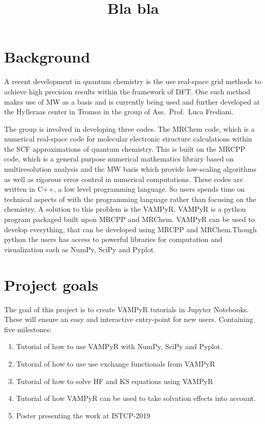 \documentclass[12pt]{article}
\begin{document}
\title{Bla bla}

\maketitle

\section{Background}

A recent development in quantum chemistry is the use real-space grid
methods to achieve high precision results within the framework of
\ac{DFT}. One such method makes use of \ac{MW} as a
basis\cite{harrison2003multiresolution}
and is currently being used and further developed at the Hylleraas
center in Tromsø in the group of Ass.~Prof.~Luca Frediani.

The group is involved in developing three codes. The \ac{MRChem} code, which is
a numerical real-space code for molecular electronic structure calculations
within the \ac{SCF} approximations of quantum chemistry. This is built on
the \ac{MRCPP} code, which is a general purpose numerical mathematics library
based on multiresolution analysis and the \ac{MW} basis which provide
low-scaling algorithms as well as rigorous error control in numerical
computations. These codes are written in C++, a low level programming language.
So users spends time on technical aspects of with the programming
language rather than focusing on the chemistry. A solution to this problem
is the \ac{VAMPyR}. \ac{VAMPyR} is a python program packaged built upon \ac{MRCPP}
and \ac{MRChem}. \ac{VAMPyR} can be used to develop everything, that
can be developed using \ac{MRCPP} and \ac{MRChem}.Though
python the users has access to powerful libraries for computation and
visualization such as NumPy, SciPy and Pyplot.

\section{Project goals}
The goal of this project is to create \ac{VAMPyR} tutorials in Jupyter Notebooks.
These will ensure an easy and interactive entry-point
for new users. Containing five milestones:

\begin{enumerate}
    \item Tutorial of how to use  \ac{VAMPyR} with NumPy, SciPy and Pyplot.
    \item Tutorial of how to use use exchange functionals from \ac{VAMPyR}
    \item Tutorial of how to solve \ac{HF} and \ac{KS} equations using \ac{VAMPyR}
    \item Tutorial of how \ac{VAMPyR} can be used to take solvation effects into
    account.
    \item Poster presenting the work at ISTCP-2019
\end{enumerate}
\end{document}
